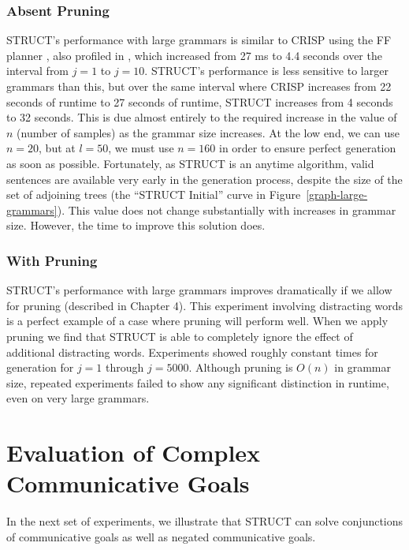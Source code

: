 \subsubsection{Absent Pruning}

STRUCT's performance with large grammars is similar to CRISP using the
FF planner \cite{hoffmann_ff_2001}, also profiled in
\cite{koller_experiences_2011}, which increased from 27 ms to 4.4
seconds over the interval from $j = 1$ to $j = 10$.  STRUCT's
performance is less sensitive to larger grammars than this, but over
the same interval where CRISP increases from 22 seconds of runtime to
27 seconds of runtime, STRUCT increases from 4 seconds to 32 seconds.
This is due almost entirely to the required increase in the value of
$n$ (number of samples) as the grammar size increases.  At the low
end, we can use $n=20$, but at $l = 50$, we must use $n = 160$ in
order to ensure perfect generation as soon as possible.  Fortunately,
as STRUCT is an anytime algorithm, valid sentences are available very
early in the generation process, despite the size of the set of
adjoining trees (the ``STRUCT Initial'' curve in
Figure~\ref{graph-large-grammars}).  This value does not change
substantially with increases in grammar size.  However, the time to
improve this solution does.

\subsubsection{With Pruning}

STRUCT's performance with large grammars improves dramatically if
we allow for pruning (described in Chapter 4).  This experiment involving distracting words
is a perfect example of a case where pruning will perform well.
When we apply pruning we find that STRUCT is able to completely ignore the effect of
additional distracting words.  Experiments showed roughly constant times for generation
for $j=1$ through $j=5000$.  Although pruning is $O(n)$ in grammar size, repeated experiments
failed to show any significant distinction in runtime, even on very large grammars.

\section{Evaluation of Complex Communicative Goals}
In the next set of experiments, we illustrate that STRUCT can solve
conjunctions of communicative goals as well as negated communicative goals.

